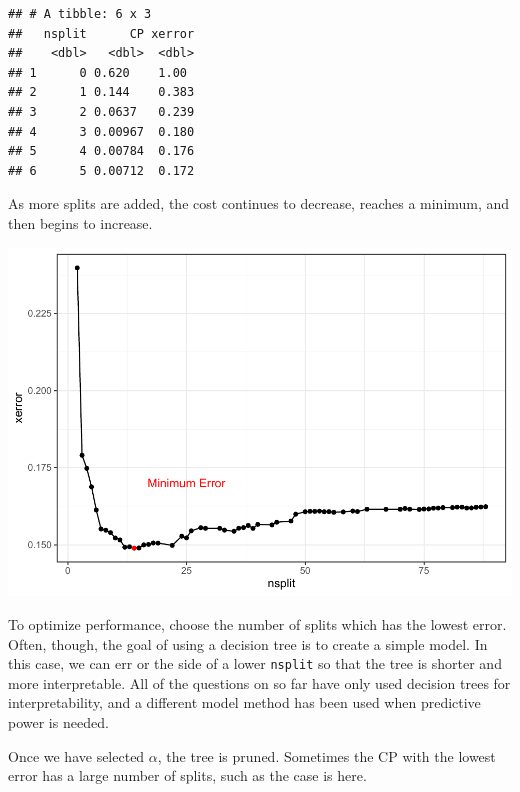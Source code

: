 \documentclass[
  openany]{book}
\newenvironment{Shaded}{\begin{snugshade}}{\end{snugshade}}
\newcommand{\KeywordTok}[1]{\textcolor[rgb]{0.13,0.29,0.53}{\textbf{#1}}}
\newcommand{\NormalTok}[1]{#1}
\newcommand{\OperatorTok}[1]{\textcolor[rgb]{0.81,0.36,0.00}{\textbf{#1}}}
\newcommand{\StringTok}[1]{\textcolor[rgb]{0.31,0.60,0.02}{#1}}
\begin{document}
\begin{verbatim}
## # A tibble: 6 x 3
##   nsplit      CP xerror
##    <dbl>   <dbl>  <dbl>
## 1      0 0.620    1.00 
## 2      1 0.144    0.383
## 3      2 0.0637   0.239
## 4      3 0.00967  0.180
## 5      4 0.00784  0.176
## 6      5 0.00712  0.172
\end{verbatim}

As more splits are added, the cost continues to decrease, reaches a minimum, and then begins to increase.

\includegraphics{06-tree-based-models_files/figure-latex/unnamed-chunk-6-1.pdf}

To optimize performance, choose the number of splits which has the lowest error. Often, though, the goal of using a decision tree is to create a simple model. In this case, we can err or the side of a lower \texttt{nsplit} so that the tree is shorter and more interpretable. All of the questions on so far have only used decision trees for interpretability, and a different model method has been used when predictive power is needed.

Once we have selected \(\alpha\), the tree is pruned. Sometimes the CP with the lowest error has a large number of splits, such as the case is here.

\begin{Shaded}
\end{Shaded}
\end{document}
